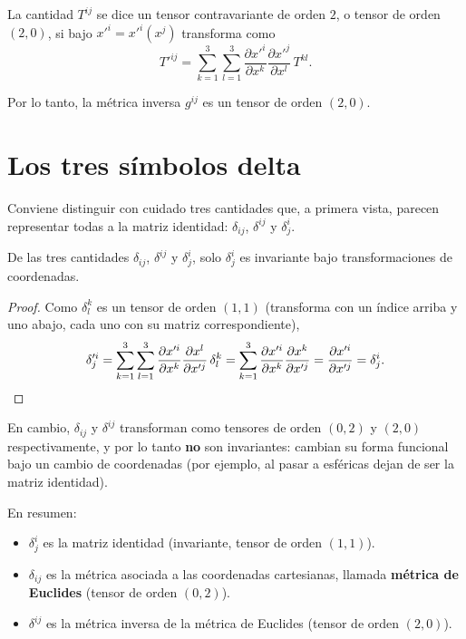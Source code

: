 \begin{definicion}
La cantidad $T^{ij}$ se dice un tensor contravariante de orden $2$, o
tensor de orden $(2,0)$, si bajo $x'^i=x'^i(x^j)$ transforma como
\[
T'^{ij} = \sum_{k=1}^{3}\sum_{l=1}^{3} \frac{\partial x'^i}{\partial
x^k}\frac{\partial x'^j}{\partial x^l}\, T^{kl} .
\]
\end{definicion}

Por lo tanto, la métrica inversa $g^{ij}$ es un tensor de orden $(2,0)$.

\section{Los tres símbolos delta}

Conviene distinguir con cuidado tres cantidades que, a primera vista,
parecen representar todas a la matriz identidad: $\delta_{ij}$,
$\delta^{ij}$ y $\delta^i_j$.

\begin{proposicionc}
De las tres cantidades $\delta_{ij}$, $\delta^{ij}$ y $\delta^i_j$, solo
$\delta^i_j$ es invariante bajo transformaciones de coordenadas.
\end{proposicionc}

\begin{proof}
Como $\delta^k_l$ es un tensor de orden $(1,1)$ (transforma con un
índice arriba y uno abajo, cada uno con su matriz correspondiente),
\[
\delta'^i_j = \sum_{k=1}^3\sum_{l=1}^3 \frac{\partial x'^i}{\partial
x^k}\frac{\partial x^l}{\partial x'^j}\, \delta^k_l = \sum_{k=1}^3
\frac{\partial x'^i}{\partial x^k}\frac{\partial x^k}{\partial x'^j} =
\frac{\partial x'^i}{\partial x'^j} = \delta^i_j . \qedhere
\]
\end{proof}

En cambio, $\delta_{ij}$ y $\delta^{ij}$ transforman como tensores de
orden $(0,2)$ y $(2,0)$ respectivamente, y por lo tanto \textbf{no} son
invariantes: cambian su forma funcional bajo un cambio de coordenadas
(por ejemplo, al pasar a esféricas dejan de ser la matriz identidad).

\begin{observacion}
En resumen:
\begin{itemize}
\item $\delta^i_j$ es la matriz identidad (invariante, tensor de orden
$(1,1)$).
\item $\delta_{ij}$ es la métrica asociada a las coordenadas cartesianas,
llamada \textbf{métrica de Euclides} (tensor de orden $(0,2)$).
\item $\delta^{ij}$ es la métrica inversa de la métrica de Euclides
(tensor de orden $(2,0)$).
\end{itemize}
\end{observacion}
